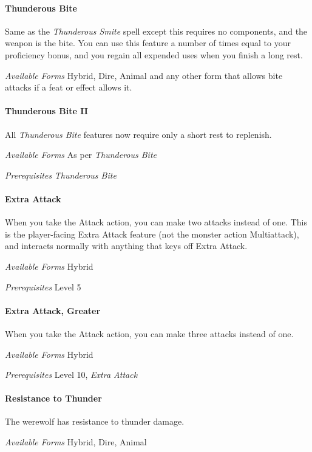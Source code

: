 \documentclass[twocolumn]{dndbook}
\begin{document}
\paragraph*{Thunderous Bite}
Same as the \emph{Thunderous Smite} spell except this requires no components, and the weapon is the bite.
You can use this feature a number of times equal to your proficiency bonus, and you regain all expended uses when you finish a long rest.\par
\emph{Available Forms} Hybrid, Dire, Animal and any other form that allows bite attacks if a feat or effect allows it.\par

\paragraph*{Thunderous Bite II}
All \emph{Thunderous Bite} features now require only a short rest to replenish.\par
\emph{Available Forms} As per \emph{Thunderous Bite} \par
\emph{Prerequisites} \emph{Thunderous Bite}\par

\paragraph*{Extra Attack}
When you take the Attack action, you can make two attacks instead of one.
This is the player-facing Extra Attack feature (not the monster action Multiattack), and interacts normally with anything that keys off Extra Attack.\par
\emph{Available Forms} Hybrid\par
\emph{Prerequisites} Level 5\par

\paragraph*{Extra Attack, Greater}
When you take the Attack action, you can make three attacks instead of one.\par
\emph{Available Forms} Hybrid\par
\emph{Prerequisites} Level 10, \emph{Extra Attack}\par

\paragraph*{Resistance to Thunder}
The werewolf has resistance to thunder damage.\par
\emph{Available Forms} Hybrid, Dire, Animal\par
\end{document}
